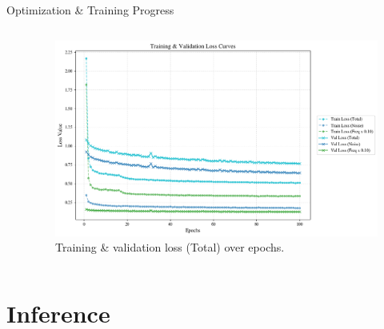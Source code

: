 \documentclass[10pt]{beamer}
\begin{document}
\begin{frame}{Optimization \& Training Progress}
\begin{columns}[T]
\begin{column}{0.45\textwidth}
    \end{column}
    \begin{column}{0.55\textwidth}
      \centering
      \begin{figure}
        \centering
        \includegraphics[width=\linewidth]{loss_curve.png}
        \caption{Training \& validation loss (Total) over epochs.}
      \end{figure}
    \end{column}
  \end{columns}
\end{frame}

\section{Inference}
\end{document}
